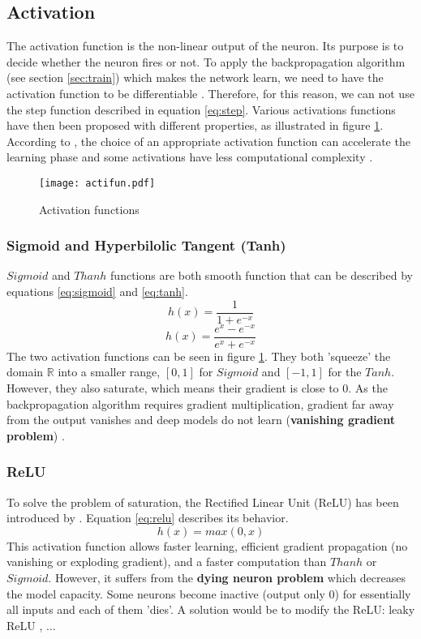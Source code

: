\subsection{Activation} \label{subs:acti}
The activation function is the non-linear output of the neuron. Its purpose is to decide whether the neuron fires or not. To apply the backpropagation algorithm (see section \ref{sec:train}) which makes the network learn, we need to have the activation function to be differentiable \cite{lecun_backpropagation_1989}. Therefore, for this reason, we can not use the step function described in equation \eqref{eq:step}. Various activations functions have then been proposed with different properties, as illustrated in figure \ref{fig:acti}. According to \textcite{khan_survey_2020}, the choice of an appropriate activation function can accelerate the learning phase and some activations have less computational complexity \cite{krizhevsky_imagenet_2012}.
%
\begin{figure}
    \centering
    \texttt{[image: actifun.pdf]}
    \caption{Activation functions}
    \label{fig:acti}
\end{figure}
%
\subsubsection{Sigmoid and Hyperbilolic Tangent (Tanh)}
$Sigmoid$ and $Thanh$ functions are both smooth function that can be described by equations \eqref{eq:sigmoid} and \eqref{eq:tanh}.
%
\begin{equation}
    h(x) = \frac{1}{1 + e^{-x}}
    \label{eq:sigmoid}
\end{equation}
%
\begin{equation}
    h(x) = \frac{e^{x} - e^{-x}}{e^{x} + e^{-x}}
    \label{eq:tanh}
\end{equation}
%
The two activation functions can be seen in figure \ref{fig:acti}. They both 'squeeze' the domain $\mathbb{R}$ into a smaller range, $[0, 1]$ for $Sigmoid$ and $[-1, 1]$ for the $Tanh$. However, they also saturate, which means their gradient is close to 0. As the backpropagation algorithm requires gradient multiplication, gradient far away from the output vanishes and deep models do not learn (\textbf{vanishing gradient problem}) \cite{goodfellow_deep_2016}.
%
\subsubsection{ReLU}
To solve the problem of saturation, the Rectified Linear Unit (ReLU) has been introduced by \textcite{krizhevsky_imagenet_2012}. Equation \eqref{eq:relu} describes its behavior.
\begin{equation}
    h(x) = max(0, x)
    \label{eq:relu}
\end{equation}
%
This activation function allows faster learning, efficient gradient propagation (no vanishing or exploding gradient), and a faster computation than $Thanh$ or $Sigmoid$. However, it suffers from the \textbf{dying neuron problem} which decreases the model capacity. Some neurons become inactive (output only 0) for essentially all inputs and each of them 'dies'. A solution would be to modify the ReLU: leaky ReLU \cite{maas_rectier_2014}, ...

